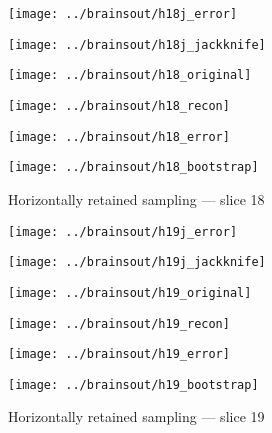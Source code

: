 \documentclass[review,supplement,onefignum,onetabnum,juq]{siamonline181217}
\begin{document}
\begin{figure}
\begin{centering}

\parbox{\imsize}{\texttt{[image: ../brainsout/h18j\_error]}}
\parbox{\imsize}{\texttt{[image: ../brainsout/h18j\_jackknife]}}

\vspace{\vertsep}

\parbox{\imsize}{\texttt{[image: ../brainsout/h18\_original]}}
\parbox{\imsize}{\texttt{[image: ../brainsout/h18\_recon]}}

\vspace{\vertsep}

\parbox{\imsize}{\texttt{[image: ../brainsout/h18\_error]}}
\parbox{\imsize}{\texttt{[image: ../brainsout/h18\_bootstrap]}}

\end{centering}
\caption{Horizontally retained sampling --- slice 18}
\end{figure}


\begin{figure}
\begin{centering}

\parbox{\imsize}{\texttt{[image: ../brainsout/h19j\_error]}}
\parbox{\imsize}{\texttt{[image: ../brainsout/h19j\_jackknife]}}

\vspace{\vertsep}

\parbox{\imsize}{\texttt{[image: ../brainsout/h19\_original]}}
\parbox{\imsize}{\texttt{[image: ../brainsout/h19\_recon]}}

\vspace{\vertsep}

\parbox{\imsize}{\texttt{[image: ../brainsout/h19\_error]}}
\parbox{\imsize}{\texttt{[image: ../brainsout/h19\_bootstrap]}}

\end{centering}
\caption{Horizontally retained sampling --- slice 19}
\end{figure}
\end{document}
